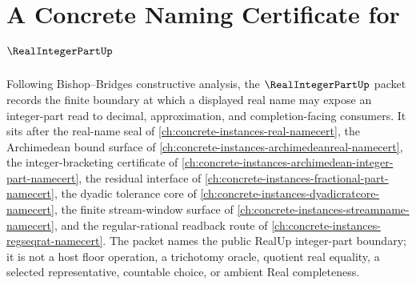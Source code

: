 \chapter{A Concrete Naming Certificate for $\RealIntegerPartUp$}
\label{ch:concrete-instances-real-integer-part-namecert}

Following Bishop--Bridges constructive analysis, the $\RealIntegerPartUp$ packet records the finite boundary at which a displayed real name may expose an integer-part read to decimal, approximation, and completion-facing consumers. It sits after the real-name seal of \autoref{ch:concrete-instances-real-namecert}, the Archimedean bound surface of \autoref{ch:concrete-instances-archimedeanreal-namecert}, the integer-bracketing certificate of \autoref{ch:concrete-instances-archimedean-integer-part-namecert}, the residual interface of \autoref{ch:concrete-instances-fractional-part-namecert}, the dyadic tolerance core of \autoref{ch:concrete-instances-dyadicratcore-namecert}, the finite stream-window surface of \autoref{ch:concrete-instances-streamname-namecert}, and the regular-rational readback route of \autoref{ch:concrete-instances-regseqrat-namecert}. The packet names the public RealUp integer-part boundary; it is not a host floor operation, a trichotomy oracle, quotient real equality, a selected representative, countable choice, or ambient Real completeness.


